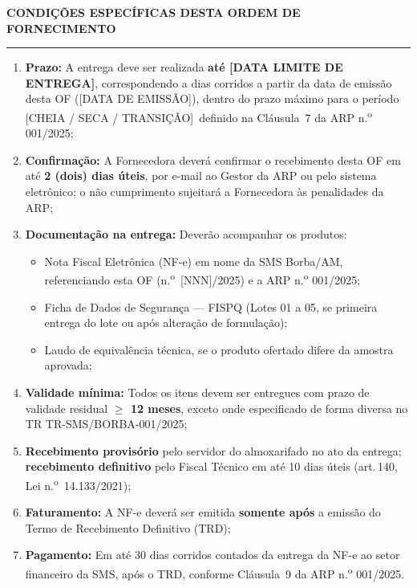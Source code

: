 \documentclass[12pt,a4paper]{article}
\newcommand{\blank}[1]{\underline{\hspace{#1}}}
\newcommand{\ofNum}{[NNN]}            %
\newcommand{\exercicio}{2025}
\newcommand{\arpRef}{ARP n.\textsuperscript{o} 001/2025}
\newcommand{\trRef}{TR-SMS/BORBA-001/2025}
\newcommand{\ofEmissao}{[DATA DE EMISSÃO]}
\newcommand{\ofPrazoEntrega}{[DATA LIMITE DE ENTREGA]}
\newcommand{\ofPeriodo}{[CHEIA / SECA / TRANSIÇÃO]}
\begin{document}
\vspace{0.3cm}
{\color{navy}\bfseries\normalsize CONDIÇÕES ESPECÍFICAS DESTA ORDEM DE
  FORNECIMENTO}\\[6pt]
\textcolor{navy!20}{\rule{\linewidth}{0.5pt}}

\begin{enumerate}
  \item \textbf{Prazo:} A entrega deve ser realizada \textbf{até \ofPrazoEntrega},
    correspondendo a \blank{2cm} dias corridos a partir da data de emissão
    desta OF (\ofEmissao), dentro do prazo máximo para o período \ofPeriodo\
    definido na Cláusula~7 da \arpRef;

  \item \textbf{Confirmação:} A Fornecedora deverá confirmar o recebimento desta OF
    em até \textbf{2 (dois) dias úteis}, por e-mail ao Gestor da ARP ou pelo sistema
    eletrônico; o não cumprimento sujeitará a Fornecedora às penalidades da ARP;

  \item \textbf{Documentação na entrega:} Deverão acompanhar os produtos:
    \begin{itemize}
      \item Nota Fiscal Eletrônica (NF-e) em nome da SMS Borba/AM, referenciando
        esta OF (n.\textsuperscript{o}~\ofNum/\exercicio) e a \arpRef;
      \item Ficha de Dados de Segurança --- FISPQ (Lotes 01 a 05, se primeira entrega
        do lote ou após alteração de formulação);
      \item Laudo de equivalência técnica, se o produto ofertado difere da amostra
        aprovada;
    \end{itemize}

  \item \textbf{Validade mínima:} Todos os itens devem ser entregues com prazo de
    validade residual \textbf{$\geq$ 12 meses}, exceto onde especificado de forma
    diversa no TR \trRef;

  \item \textbf{Recebimento provisório} pelo servidor do almoxarifado no ato da
    entrega; \textbf{recebimento definitivo} pelo Fiscal Técnico em até 10 dias
    úteis (art.\,140, Lei n.\textsuperscript{o}~14.133/2021);

  \item \textbf{Faturamento:} A NF-e deverá ser emitida \textbf{somente após}
    a emissão do Termo de Recebimento Definitivo (TRD);

  \item \textbf{Pagamento:} Em até 30 dias corridos contados da entrega da NF-e
    ao setor financeiro da SMS, após o TRD, conforme Cláusula~9 da \arpRef.
\end{enumerate}
\end{document}
